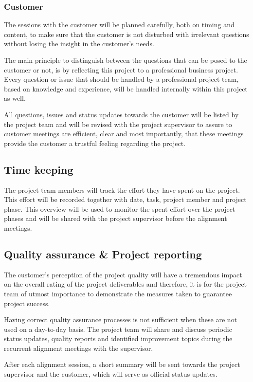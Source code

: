 \subsubsection{Customer}
The sessions with the customer will be planned carefully, both on timing and content, to make sure that the customer is not disturbed  with irrelevant questions without losing the insight in the customer's needs.

The main principle to distinguish between the questions that can be posed to the customer or not, is by reflecting this project to a professional business project.
Every question or issue that should be handled by a professional project team, based on knowledge and experience, will be handled internally within this project as well.

All questions, issues and status updates towards the customer will be listed by the project team and will be revised with the project supervisor to assure to customer meetings are efficient, clear and most importantly, that these meetings provide the customer a trustful feeling regarding the project.

\subsection{Time keeping}
The project team members will track the effort they have spent on the project.
This effort will be recorded together with date, task, project member and project phase.
This overview will be used to monitor the spent effort over the project phases and will be shared with the project supervisor before the alignment meetings.

\subsection{Quality assurance \& Project reporting}
The customer's perception of the project quality will have a tremendous impact on the overall rating of the project deliverables and therefore, it is for the project team of utmost importance to demonstrate the measures taken to guarantee project success.

Having correct quality assurance processes is not sufficient when these are not used on a day-to-day basis.
The project team will share and discuss periodic status updates, quality reports and identified improvement topics during the recurrent alignment meetings with the supervisor.

After each alignment session, a short summary will be sent towards the project supervisor and the customer, which will serve as official status updates.

